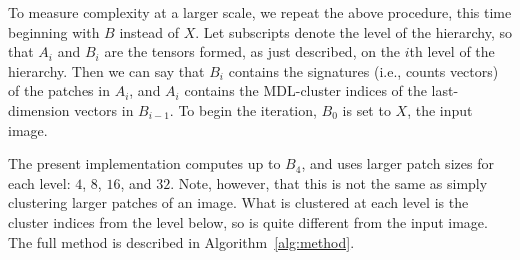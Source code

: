 \documentclass[a4paper,fleqn]{cas-sc}
\theoremstyle{remark}
\begin{document}
To measure complexity at a larger scale, we repeat the above procedure, this time beginning with $B$ instead of $X$. Let subscripts denote the level of the hierarchy, so that $A_i$ and $B_i$ are the tensors formed, as just described, on the $i$th level of the hierarchy. Then we can say that $B_i$ contains the signatures (i.e., counts vectors) of the patches in $A_i$, and $A_i$ contains the MDL-cluster indices of the last-dimension vectors in $B_{i-1}$. To begin the iteration, $B_0$ is set to $X$, the input image. 

The present implementation computes up to $B_4$, and uses larger patch sizes for each level: $4$, $8$, $16$, and $32$. Note, however, that this is not the same as simply clustering larger patches of an image. What is clustered at each level is the cluster indices from the level below, so is quite different from the input image. The full method is described in Algorithm~\ref{alg:method}. 

\end{document}
